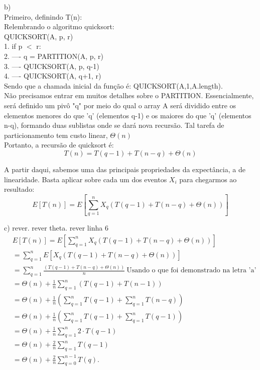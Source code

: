 \documentclass{article}
\begin{document}
b)\\
Primeiro, definindo T(n):\\
Relembrando o algoritmo quicksort:\\
QUICKSORT(A, p, r) \\
1. if p $<$ r: \\
2. ---- q = PARTITION(A, p, r) \\
3. ---- QUICKSORT(A, p, q-1) \\
4. ---- QUICKSORT(A, q+1, r) \\
Sendo que a chamada inicial da função é: QUICKSORT(A,1,A.length).\\
Não precisamos entrar em muitos detalhes sobre o PARTITION. Essencialmente, será definido um pivô "q" por meio do qual o array A será dividido entre os elementos menores do que 'q' (elementos q-1) e os maiores do que 'q' (elementos n-q), formando duas sublistas onde se dará nova recursão. Tal tarefa de particionamento tem custo linear, $\Theta(n)$\\
Portanto, a recursão de quicksort é:\\
\begin{equation}
 T(n) = T(q-1)+T(n-q)+\Theta(n)
\end{equation}

A partir daqui, sabemos uma das principais propriedades da expectância, a de linearidade. Basta aplicar sobre cada um dos eventos $X_{i}$ para chegarmos ao resultado:
\begin{equation}
E[T(n)]=E\left[\sum_{q=1}^{n}X_q(T(q-1)+T(n-q)+\Theta(n))\right]  
\end{equation}


c) rever. rever theta. rever linha 6 \\
\begin{align*}
&E[T(n)]=E\left[\sum_{q=1}^{n}X_q(T(q-1)+T(n-q)+\Theta(n))\right]   \\
&= \sum_{q=1}^n  E[X_q(T(q-1)+T(n-q)+\Theta(n))]\\
&= \sum_{q=1}^n \frac{(T(q-1)+T(n-q)+\Theta(n))}{n}\  \text{Usando o que foi demonstrado na letra 'a'} \\
&= \Theta(n)+\frac{1}{n} \sum_{q=1}^n(T(q-1)+T(n-1)) \\
&= \Theta(n)+\frac{1}{n} \left(\sum_{q=1}^n T(q-1)+\sum_{q=1}^nT(n-q) \right) \\
&= \Theta(n)+\frac{1}{n} \left(\sum_{q=1}^n T(q-1)+\sum_{q=1}^nT(q-1) \right) \\
&= \Theta(n)+\frac{1}{n} \sum_{q=1}^n 2\cdot T(q-1) \\
&= \Theta(n)+\frac{2}{n} \sum_{q=1}^n T(q-1) \\
&= \Theta(n)+\frac{2}{n} \sum_{q=0}^{n-1} T(q). \\
\end{align*}
\end{document}
